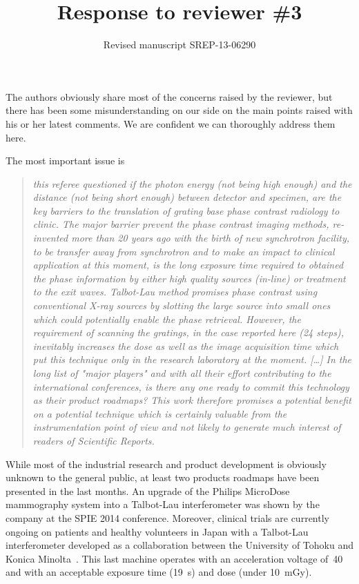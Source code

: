 \documentclass[a4paper,english]{scrartcl}
\title{Response to reviewer \#3}
\author{Revised manuscript SREP-13-06290}
\date{}
\newenvironment{reviewerquote}{\begin{quote}\itshape}{\end{quote}}
\begin{document}
\maketitle

\noindent

The authors obviously share most of the concerns raised by the reviewer, but
there has been some misunderstanding on our side on the main points raised
with his or her latest comments.
We are confident we can thoroughly address them here.

The most important issue is

\begin{reviewerquote}
    this referee questioned if the photon energy (not being high enough) and
    the distance (not being short enough) between detector and specimen, are
    the key barriers to the translation of grating base phase contrast
    radiology to clinic. The major barrier prevent the phase contrast
    imaging methods, re-invented more than 20 years ago with the birth of
    new synchrotron facility, to be transfer away from synchrotron and to
    make an impact to clinical application at this moment, is the long
    exposure time required to obtained the phase information by either high
    quality sources (in-line) or treatment to the exit waves. Talbot-Lau
    method promises phase contrast using conventional X-ray sources by
    slotting the large source into small ones which could potentially enable
    the phase retrieval. However, the requirement of scanning the gratings,
    in the case reported here (24 steps), inevitably increases the dose as
    well as the image acquisition time which put this technique only in the
    research laboratory at the moment. [\ldots] In the long list of "major
    players" and with all their effort contributing to the international
    conferences, is there any one ready to commit this technology as their
    product roadmaps? This work therefore promises a potential benefit on a
    potential technique which is certainly valuable from the instrumentation
    point of view and not likely to generate much interest of readers of
    Scientific Reports.
\end{reviewerquote}

While most of the industrial research and product development is obviously
unknown to the general public, at least two products roadmaps have been presented in
the last months. An upgrade of the Philips MicroDose mammography system into a
Talbot-Lau interferometer was shown by the company at the SPIE 
2014 conference\cite{Roessl2014}. Moreover, clinical trials are currently
ongoing on patients and healthy volunteers in Japan with a Talbot-Lau interferometer
developed as a collaboration between the University of Tohoku and Konica
Minolta~\cite{Momose06032014}. This last machine operates with an
acceleration voltage of~\SI{40}{\kilo\voltpeak} and with an acceptable
exposure time (\SI{19}{\second}) and dose (under \SI{10}{\milli\gray}).
\end{document}
